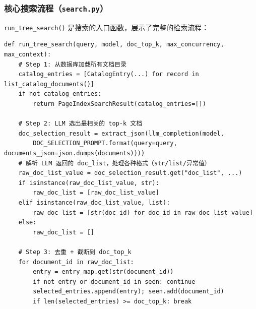 \documentclass[presentation,aspectratio=169]{ctexbeamer}
\begin{document}
\begin{frame}[fragile]
\frametitle{核心搜索流程（\texttt{search.py}）}
{\scriptsize \texttt{run\_tree\_search()} 是搜索的入口函数，展示了完整的检索流程：}

\vspace{0.05cm}
{\tiny
\begin{verbatim}
def run_tree_search(query, model, doc_top_k, max_concurrency, max_context):
    # Step 1: 从数据库加载所有文档目录
    catalog_entries = [CatalogEntry(...) for record in list_catalog_documents()]
    if not catalog_entries:
        return PageIndexSearchResult(catalog_entries=[])

    # Step 2: LLM 选出最相关的 top-k 文档
    doc_selection_result = extract_json(llm_completion(model,
        DOC_SELECTION_PROMPT.format(query=query, documents_json=json.dumps(documents))))
    # 解析 LLM 返回的 doc_list，处理各种格式（str/list/异常值）
    raw_doc_list_value = doc_selection_result.get("doc_list", ...)
    if isinstance(raw_doc_list_value, str):
        raw_doc_list = [raw_doc_list_value]
    elif isinstance(raw_doc_list_value, list):
        raw_doc_list = [str(doc_id) for doc_id in raw_doc_list_value]
    else:
        raw_doc_list = []

    # Step 3: 去重 + 截断到 doc_top_k
    for document_id in raw_doc_list:
        entry = entry_map.get(str(document_id))
        if not entry or document_id in seen: continue
        selected_entries.append(entry); seen.add(document_id)
        if len(selected_entries) >= doc_top_k: break
\end{verbatim}}
\end{frame}

\end{document}
